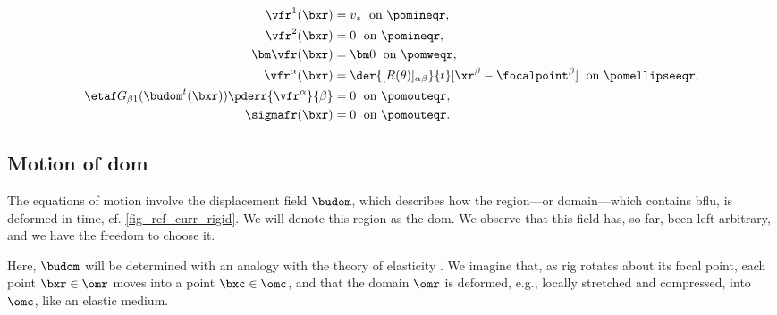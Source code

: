 \begin{align}
    \label{bc_fl_rigid_1_reference}
    \vfr^1(\bxr)                                                  & =  v_\ast \; \text{ on } \pomineqr,                                                                    \\
    \label{bc_fl_rigid_2_reference}
    \vfr^2      (\bxr)                                            & =  0 \; \text{ on } \pomineqr ,                                                                        \\
    \label{bc_fl_rigid_3_reference}
    {\bm \vfr} (\bxr)                                             & = {\bm 0} \; \text{ on } \pomweqr ,                                                                    \\
    \label{bc_fl_rigid_4_reference}
    \vfr^\alpha(\bxr)                                             & = \der{[R(\theta)]_{\alpha \beta} }{t} [\xr^\beta - \focalpoint^\beta] \; \text{ on } \pomellipseeqr , \\
    \label{bc_fl_rigid_5_reference}
    \etaf G_{\beta 1}(\budom^t(\bxr)) \pderr{ \vfr^\alpha}{\beta} & = 0  \; \text{ on } \pomouteqr ,                                                                       \\
    \label{bc_fl_rigid_6_reference}
    \sigmafr (\bxr)                                               & = 0 \; \text{ on } \pomouteqr.
\end{align}




\subsection{Motion of \acl{dom}}
\label{sec_eq_fluid_domain}


The equations of motion \crefs{\eqsfluidbodyref} involve the displacement field $\budom$, which describes how the region---or domain---which contains \ac{bflu}, is deformed in time, cf. \cref{fig_ref_curr_rigid}. We will denote this region as the  \ac{dom}.
We observe that this field has, so far, been left arbitrary, and we have the freedom to choose it.

Here, $\budom$ will be determined with an analogy with the theory of elasticity \cite{kamenskyLectureNotesMAE}. We imagine that, as \ac{rig} rotates about its focal point,  each point $\bxr \in \omr$ moves into a point $\bxc \in \omc$, and that the domain $\omr$ is deformed, e.g., locally stretched and compressed, into $\omc$, like an elastic medium.

